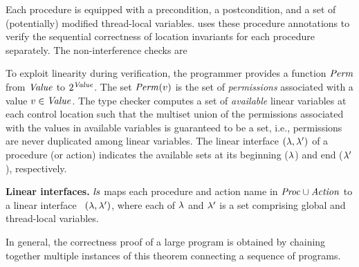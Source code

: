 Each procedure is equipped with a precondition, a postcondition,
and a set of (potentially) modified thread-local variables.
\civl uses these procedure annotations to verify the sequential correctness of location invariants for each
procedure separately.
The non-interference checks are 


To exploit linearity during verification, the programmer provides a function $\mathit{Perm}$ from $\mathit{Value}$ to $2^{\mathit{Value}}$.
The set $\mathit{Perm}(v)$ is the set of {\em permissions\/} associated with a value $v \in \mathit{Value}$.
The \civl type checker computes a set of {\em available\/} linear variables at each control location such that
the multiset union of the permissions associated with the values in available variables is guaranteed to be a set, i.e., 
permissions are never duplicated among linear variables.
The linear interface $(\lambda, \lambda')$ of a procedure (or action) indicates the available sets
at its beginning ($\lambda$) and end ($\lambda'$), respectively.


\noindent
{\bf Linear interfaces.}
$\mathit{ls}$ maps each procedure and action name in $\mathit{Proc} \cup \mathit{Action}$ to a linear interface~\cite{Wadler90lineartypes}
$(\lambda,\lambda')$, where each of $\lambda$ and $\lambda'$ is a set comprising global and thread-local variables.


In general, the correctness proof of a large program is obtained by chaining together
multiple instances of this theorem connecting a sequence of programs.  



